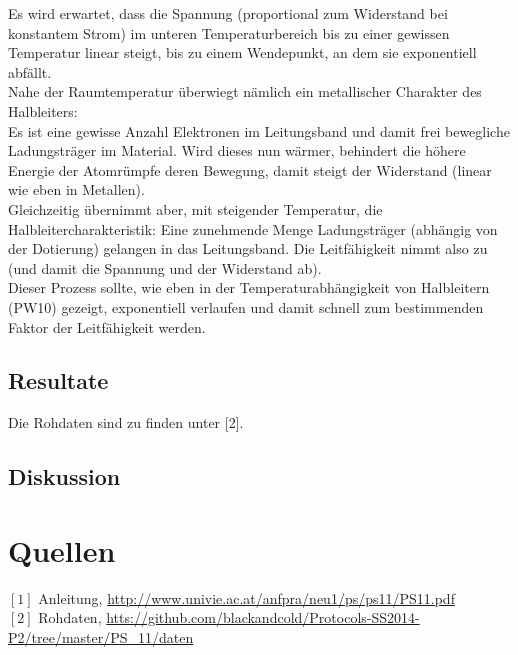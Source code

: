 \documentclass[12pt,a4paper]{article}
\begin{document}
\begin{multicols}{2}
Es wird erwartet, dass die Spannung (proportional zum Widerstand bei konstantem Strom) im unteren Temperaturbereich bis zu einer gewissen Temperatur linear steigt, bis zu einem Wendepunkt, an dem sie exponentiell abfällt.\\
Nahe der Raumtemperatur überwiegt nämlich ein metallischer Charakter des Halbleiters:\\
Es ist eine gewisse Anzahl Elektronen im  Leitungsband und damit frei bewegliche Ladungsträger im Material. Wird dieses nun wärmer, behindert die höhere Energie der Atomrümpfe deren Bewegung, damit steigt der Widerstand (linear wie eben in Metallen).\\
Gleichzeitig übernimmt aber, mit steigender Temperatur, die Halbleitercharakteristik: Eine zunehmende Menge Ladungsträger (abhängig von der Dotierung) gelangen in das Leitungsband. Die Leitfähigkeit nimmt also zu (und damit die Spannung und der Widerstand ab).\\
Dieser Prozess sollte, wie eben in der Temperaturabhängigkeit von Halbleitern (PW10) gezeigt, exponentiell verlaufen und damit schnell zum bestimmenden Faktor der Leitfähigkeit werden.





\subsection{Resultate}


 




\noindent Die Rohdaten sind zu finden unter [2].

\subsection{Diskussion}


\section{Quellen}
$[1]$ Anleitung, \url{http://www.univie.ac.at/anfpra/neu1/ps/ps11/PS11.pdf}\\
$[2]$ Rohdaten, \url{htts://github.com/blackandcold/Protocols-SS2014-P2/tree/master/PS_11/daten}\\

\end{multicols}
\end{document}
